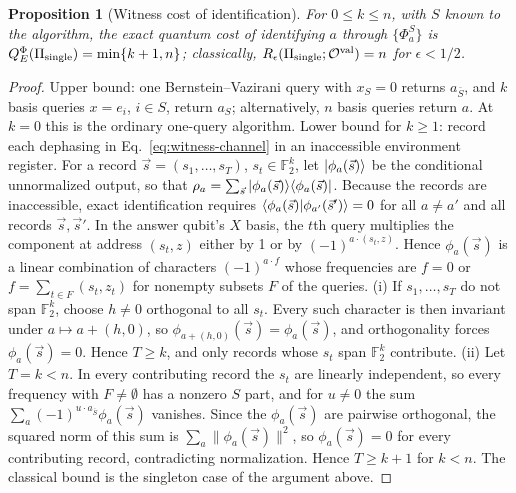 \documentclass[
  aps,
  pra,
  reprint,
  nofootinbib
]{revtex4-2}
\newtheorem{proposition}{Proposition}
\begin{document}
\begin{proposition}[Witness cost of identification]\label{prop:witness}
For \(0\le k\le n\), with \(S\) known to the algorithm, the exact quantum cost
of identifying \(a\) through \(\{\Phi_a^S\}\) is
\(Q_E^{\Phi}(\Pi_{\rm single})=\min\{k+1,n\}\); classically,
\(R_\epsilon(\Pi_{\rm single};\mathcal O^{\mathrm{val}})=n\) for
\(\epsilon<1/2\).
\end{proposition}

\begin{proof}
Upper bound: one Bernstein--Vazirani query with \(x_S=0\) returns
\(a_{\bar S}\), and \(k\) basis queries \(x=e_i\), \(i\in S\), return
\(a_S\); alternatively, \(n\) basis queries return \(a\). At \(k=0\) this is
the ordinary one-query algorithm. Lower bound for \(k\ge1\): record each
dephasing in Eq.~\eqref{eq:witness-channel} in an inaccessible environment
register. For a record \(\vec s=(s_1,\ldots,s_T)\), \(s_t\in\mathbb F_2^k\), let
\(\ket{\phi_a(\vec s)}\) be the conditional unnormalized output, so that
\(\rho_a=\sum_{\vec s}\ket{\phi_a(\vec s)}\!\bra{\phi_a(\vec s)}\). Because the
records are inaccessible, exact identification requires
\(\braket{\phi_a(\vec s)|\phi_{a'}(\vec s')}=0\) for all \(a\neq a'\) and all
records \(\vec s,\vec s'\). In the answer qubit's \(X\) basis, the \(t\)th query
multiplies the component at address \((s_t,z)\) either by 1 or by
\((-1)^{a\cdot(s_t,z)}\). Hence \(\phi_a(\vec s)\) is a linear combination of
characters \((-1)^{a\cdot f}\) whose frequencies are \(f=0\) or
\(f=\sum_{t\in F}(s_t,z_t)\) for nonempty subsets \(F\) of the queries.
(i) If \(s_1,\ldots,s_T\) do not span \(\mathbb F_2^k\), choose \(h\neq0\)
orthogonal to all \(s_t\). Every such character is then invariant under
\(a\mapsto a+(h,0)\), so \(\phi_{a+(h,0)}(\vec s)=\phi_a(\vec s)\), and
orthogonality forces \(\phi_a(\vec s)=0\). Hence \(T\ge k\), and only records
whose \(s_t\) span \(\mathbb F_2^k\) contribute. (ii) Let \(T=k<n\). In every
contributing record the \(s_t\) are linearly independent, so every frequency
with \(F\neq\emptyset\) has a nonzero \(S\) part, and for \(u\neq0\) the sum
\(\sum_a(-1)^{u\cdot a_{\bar S}}\phi_a(\vec s)\) vanishes. Since the
\(\phi_a(\vec s)\) are pairwise orthogonal, the squared norm of this sum is
\(\sum_a\lVert\phi_a(\vec s)\rVert^2\), so \(\phi_a(\vec s)=0\) for every
contributing record, contradicting normalization. Hence \(T\ge k+1\) for
\(k<n\). The classical bound is the singleton case of the argument above.
\end{proof}
\end{document}
